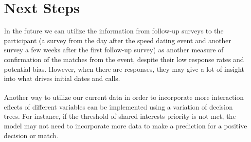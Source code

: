 \documentclass{article}
\begin{document}
\section{Next Steps}
In the future we can utilize the information from follow-up surveys to the participant (a survey from the day after the speed dating event and another survey a few weeks after the first follow-up survey) as another measure of confirmation of the matches from the event, despite their low response rates and potential bias.  However, when there are responses, they may give a lot of insight into what drives initial dates and calls.\\
\null\\
Another way to utilize our current data in order to incorporate more interaction effects of different variables can be implemented using a variation of decision trees. For instance, if the threshold of shared interests priority is not met, the model may not need to incorporate more data to make a prediction for a positive decision or match.  
\end{document}
